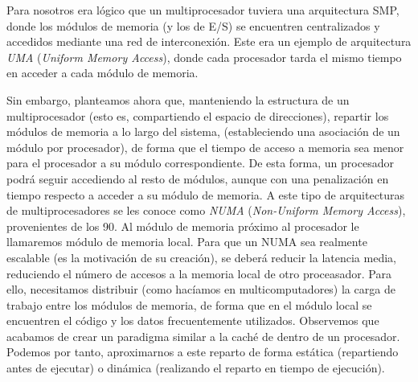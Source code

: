 Para nosotros era lógico que un multiprocesador tuviera una arquitectura SMP, donde los módulos de memoria (y los de E/S) se encuentren centralizados y accedidos mediante una red de interconexión. Este era un ejemplo de arquitectura \emph{UMA} (\emph{Uniform Memory Access}), donde cada procesador tarda el mismo tiempo en acceder a cada módulo de memoria.

Sin embargo, planteamos ahora que, manteniendo la estructura de un multiprocesador (esto es, compartiendo el espacio de direcciones), repartir los módulos de memoria a lo largo del sistema, (estableciendo una asociación de un módulo por procesador), de forma que el tiempo de acceso a memoria sea menor para el procesador a su módulo correspondiente. De esta forma, un procesador podrá seguir accediendo al resto de módulos, aunque con una penalización en tiempo respecto a acceder a su módulo de memoria. A este tipo de arquitecturas de multiprocesadores se les conoce como \emph{NUMA} (\emph{Non-Uniform Memory Access}), provenientes de los 90. Al módulo de memoria próximo al procesador le llamaremos módulo de memoria local. Para que un NUMA sea realmente escalable (es la motivación de su creación), se deberá reducir la latencia media, reduciendo el número de accesos a la memoria local de otro proceasador. Para ello, necesitamos distribuir (como hacíamos en multicomputadores) la carga de trabajo entre los módulos de memoria, de forma que en el módulo local se encuentren el código y los datos frecuentemente utilizados. Observemos que acabamos de crear un paradigma similar a la caché de dentro de un procesador. Podemos por tanto, aproximarnos a este reparto de forma estática (repartiendo antes de ejecutar) o dinámica (realizando el reparto en tiempo de ejecución).

